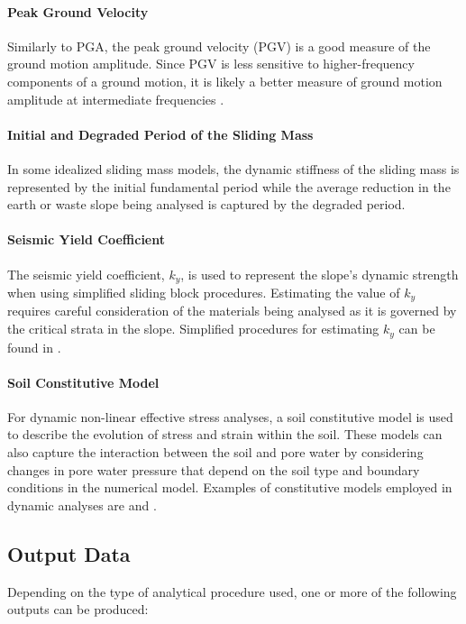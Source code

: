 \paragraph{Peak Ground Velocity}
Similarly to PGA, the peak ground velocity (PGV) is a good measure of the ground motion amplitude. Since PGV is less sensitive to higher-frequency components of a ground motion, it is likely a better measure of ground motion amplitude at intermediate frequencies \citep{kramer1996geotechnical}.

\paragraph{Initial and Degraded Period of the Sliding Mass}
In some idealized sliding mass models, the dynamic stiffness of the sliding mass is represented by the initial fundamental period while the average reduction in the earth or waste slope being analysed is captured by the degraded period.

\paragraph{Seismic Yield Coefficient}
The seismic yield coefficient, $k_y$, is used to represent the slope's dynamic strength when using simplified sliding block procedures. Estimating the value of $k_y$ requires careful consideration of the materials being analysed as it is governed by the critical strata in the slope. Simplified procedures for estimating $k_y$ can be found in \cite{bray1998simplified}.

\paragraph{Soil Constitutive Model}
For dynamic non-linear effective stress analyses, a soil constitutive model is used to describe the evolution of stress and strain within the soil. These models can also capture the interaction between the soil and pore water by considering changes in pore water pressure that depend on the soil type and boundary conditions in the numerical model. Examples of constitutive models employed in dynamic analyses are \cite{yang2003computational, byrne2004numerical, boulanger2017pm4sand} and \cite{boulanger2018pm4silt}.

\subsection{Output Data}
\label{subsec:eq_landslide_output}
Depending on the type of analytical procedure used, one or more of the following outputs can be produced:

